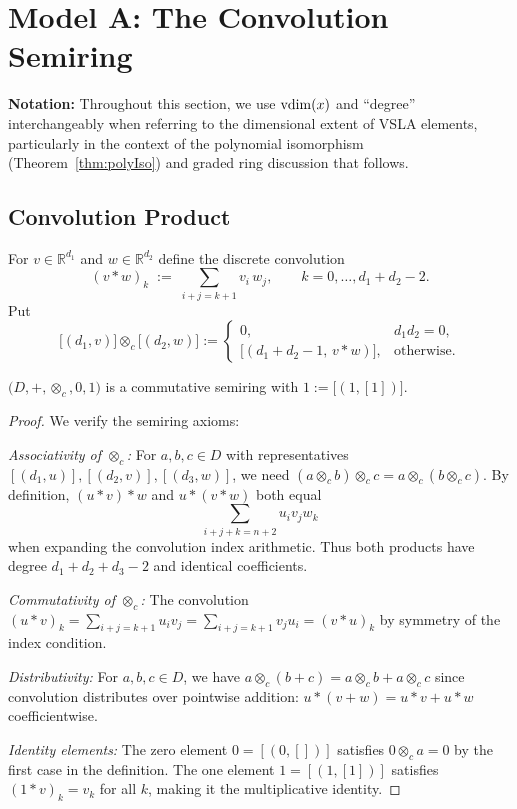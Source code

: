 \section{Model A: The Convolution Semiring}
\label{sec:modelA}

\noindent \textbf{Notation:} Throughout this section, we use $\operatorname{vdim}(x)$ and ``degree'' interchangeably when referring to the dimensional extent of VSLA elements, particularly in the context of the polynomial isomorphism (Theorem~\ref{thm:polyIso}) and graded ring discussion that follows.

\subsection{Convolution Product}
\begin{definition}
For \(v\in\mathbb R^{d_1}\) and \(w\in\mathbb R^{d_2}\) define the discrete convolution
\[
  (v\ast w)_k \;:=\;\sum_{i+j=k+1} v_i\,w_j,\qquad k=0,\dots,d_1+d_2-2.
\]
Put
\[
  \bigl[(d_1,v)\bigr]\otimes_c\bigl[(d_2,w)\bigr]
  :=\begin{cases}
       0, & d_1d_2=0, \\
       \bigl[(d_1+d_2-1,\,v\ast w)\bigr], & \text{otherwise.}
     \end{cases}
\]
\end{definition}


\begin{theorem}\label{thm:convSemiring}
\(\bigl(D,+,\otimes_c,0,1\bigr)\) is a commutative semiring with \(1:=\bigl[(1,[1])\bigr]\).
\end{theorem}
\begin{proof}
We verify the semiring axioms:

\textit{Associativity of $\otimes_c$:}
For $a, b, c \in D$ with representatives $[(d_1,u)], [(d_2,v)], [(d_3,w)]$, we need $(a \otimes_c b) \otimes_c c = a \otimes_c (b \otimes_c c)$. By definition, $(u \ast v) \ast w$ and $u \ast (v \ast w)$ both equal
\[
\sum_{i+j+k=n+2} u_i v_j w_k
\]
when expanding the convolution index arithmetic. Thus both products have degree $d_1 + d_2 + d_3 - 2$ and identical coefficients.

\textit{Commutativity of $\otimes_c$:}
The convolution $(u \ast v)_k = \sum_{i+j=k+1} u_i v_j = \sum_{i+j=k+1} v_j u_i = (v \ast u)_k$ by symmetry of the index condition.

\textit{Distributivity:}
For $a, b, c \in D$, we have $a \otimes_c (b + c) = a \otimes_c b + a \otimes_c c$ since convolution distributes over pointwise addition: $u \ast (v + w) = u \ast v + u \ast w$ coefficientwise.

\textit{Identity elements:}
The zero element $0 = [(0,[])]$ satisfies $0 \otimes_c a = 0$ by the first case in the definition. The one element $1 = [(1,[1])]$ satisfies $(1 \ast v)_k = v_k$ for all $k$, making it the multiplicative identity.
\end{proof}

